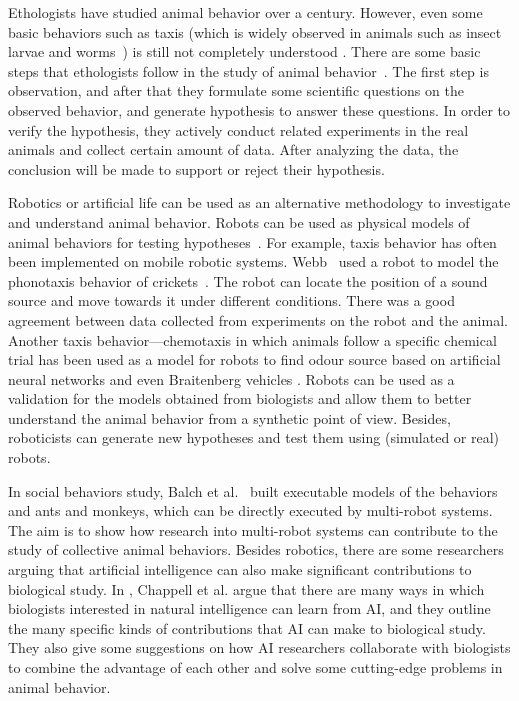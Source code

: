 Ethologists have studied animal behavior over a century. However, even some basic behaviors such as taxis (which is widely observed in animals such as insect larvae and worms~\citep{Fraenkel:DP:1961, Stephen:Op:1990}) is still not completely understood \cite{Rano_2009}. There are some basic steps that ethologists follow in the study of animal behavior~\cite{camazine2003self}. The first step is observation, and after that they formulate some scientific questions on the observed behavior, and generate hypothesis to answer these questions. In order to verify the hypothesis, they actively conduct related experiments in the real animals and collect certain amount of data. After analyzing the data, the conclusion will be made to support or reject their hypothesis.

Robotics or artificial life can be used as an alternative methodology to investigate and understand animal behavior. Robots can be used as physical models of animal behaviors for testing hypotheses~\citep{Barbara_2000, Meyer2008}. For example, taxis behavior has often been implemented on mobile robotic systems. Webb~\citep{Barbara_1995} used a robot to model the phonotaxis behavior of crickets~\citep{Popov:JCP:1997}. The robot can locate the position of a sound source and move towards it under different conditions. There was a good agreement between data collected from experiments on the robot and the animal. Another taxis behavior---chemotaxis in which animals follow a specific chemical trial has been used as a model for robots to find odour source based on artificial neural networks \cite{Farah_2002} and even Braitenberg vehicles \cite{Lilienthal_2003}. Robots can be used as a validation for the models obtained from biologists and allow them to better understand the animal behavior from a synthetic point of view.  Besides, roboticists can generate new hypotheses and test them using (simulated or real) robots.
 
In social behaviors study, Balch et al.~\citep{Balch_2006} built executable models of the behaviors and ants and monkeys, which can be directly executed by multi-robot systems. The aim is to show how research into multi-robot systems can contribute to the study of collective animal behaviors. Besides robotics, there are some researchers arguing that artificial intelligence can also make significant contributions to biological study. In \cite{Chappell_2010}, Chappell et al. argue that there are many ways in which biologists interested in natural intelligence can learn from AI, and they outline the many specific kinds of contributions that AI can make to biological study. They also give some suggestions on how AI researchers collaborate with biologists to combine the advantage of each other and solve some cutting-edge problems in animal behavior.

